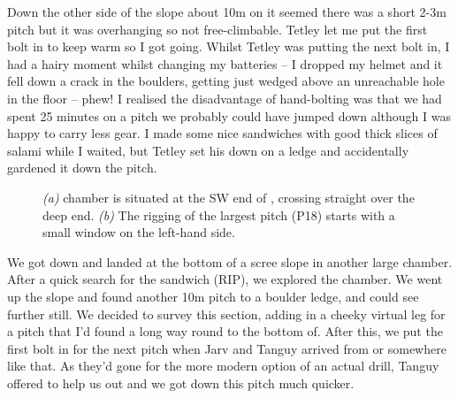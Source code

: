 Down the other side of the slope about 10m on it seemed there was a short 2-3m pitch but it was overhanging so not free-climbable. Tetley let me put the first bolt in to keep warm so I got going. Whilst Tetley was putting the next bolt in, I had a hairy moment whilst changing my batteries – I dropped my helmet and it fell down a crack in the boulders, getting just wedged above an unreachable hole in the floor – phew! I realised the disadvantage of hand-bolting was that we had spent 25 minutes on a pitch we probably could have jumped down although I was happy to carry less gear. I made some nice sandwiches with good thick slices of salami while I waited, but Tetley set his down on a ledge and accidentally gardened it down the pitch. 


\begin{figure*}[t!]
	\checkoddpage \ifoddpage \forcerectofloat \else \forceversofloat \fi
	\centering
	\begin{subfigure}[t]{0.6337\textwidth}
		\centering
		 \caption{}\label{hammerhead passage}
	\end{subfigure}
  	 \hfill
   	 \begin{subfigure}[t]{0.3563\textwidth}
        		\centering
        		\caption{} \label{hammerhead pitch}
        \end{subfigure}
	\caption{
	 	  \textit{(a)} \protect{} chamber is situated at the SW end of \protect{}, crossing straight over the deep end.  
   		 \textit{(b)} The rigging of the largest \protect{} pitch (P18) starts with a small window on the left-hand side. }
\end{figure*}

We got down and landed at the bottom of a scree slope in another large chamber. After a quick search for the sandwich (RIP), we explored the chamber. We went up the slope and found another 10m pitch to a boulder ledge, and could see further still.  We decided to survey this section, adding in a cheeky virtual leg for a pitch that I'd found a long way round to the bottom of. After this, we put the first bolt in for the next pitch when Jarv and Tanguy arrived from  or somewhere like that. As they'd gone for the more modern option of an actual drill, Tanguy offered to help us out and we got down this pitch much quicker. 


